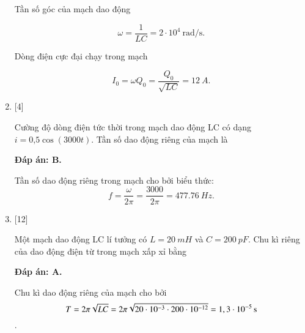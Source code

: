 \begin{enumerate}[label=\bfseries Câu \arabic*:]
{		Tần số góc của mạch dao động 
		
		$$\omega = \dfrac{1}{LC} = 2\cdot 10^4\ \text{rad/s}.$$
		
		Dòng điện cực đại chạy trong mạch
		
		$$I_0 = \omega Q_0 = \dfrac{Q_0}{\sqrt{LC}} = \SI{12}{A}.$$
		
		
		
		
		
	}
	\item {} [4]
	
	{Cường độ dòng điện tức thời trong mạch dao động LC có dạng $i = \text{0,5} \cos \left( 3000t \right)$. Tần số dao động riêng của mạch là  
	}
	
	\hideall
	{		\textbf{Đáp án: B.}
		
		Tần số dao động riêng trong mạch cho bởi biểu thức:
		$$
		f=\dfrac{\omega}{2 \pi}=\dfrac{3000}{2 \pi}= \SI{477,76}{Hz}.
		$$
		
	}
	
	\item {} [12]
	
	{Một mạch dao động LC lí tưởng có $L = \SI{20}{mH}$ và $C = \SI{200}{pF}$. Chu kì riêng của dao động điện từ trong mạch xấp xỉ bằng
	}
	
	\hideall
	{		\textbf{Đáp án: A.}
		
		Chu kì dao động riêng của mạch cho bởi 
		$$ T = 2\pi \sqrt{LC} = 2\pi \sqrt{20\cdot10^{-3} \cdot 200\cdot10^{-12}} = \xsi{1,3\cdot10^{-5}}{s} $$.
		
}
\end{enumerate}
